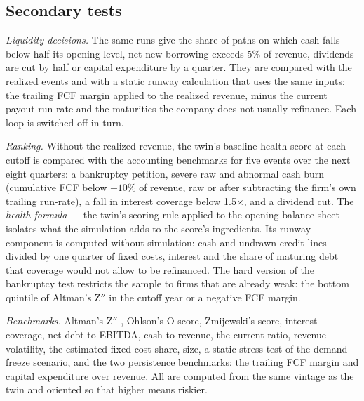 \documentclass[11pt]{article}
\begin{document}
\subsection{Secondary tests}
\emph{Liquidity decisions.} The same runs give the share of paths on which cash falls below half its opening level, net new borrowing exceeds 5\% of revenue, dividends are cut by half or capital expenditure by a quarter. They are compared with the realized events and with a static runway calculation that uses the same inputs: the trailing FCF margin applied to the realized revenue, minus the current payout run-rate and the maturities the company does not usually refinance. Each loop is switched off in turn.

\emph{Ranking.} Without the realized revenue, the twin's baseline health score at each cutoff is compared with the accounting benchmarks for five events over the next eight quarters: a bankruptcy petition, severe raw and abnormal cash burn (cumulative FCF below $-10\%$ of revenue, raw or after subtracting the firm's own trailing run-rate), a fall in interest coverage below 1.5$\times$, and a dividend cut. The \emph{health formula} --- the twin's scoring rule applied to the opening balance sheet --- isolates what the simulation adds to the score's ingredients. Its runway component is computed without simulation: cash and undrawn credit lines divided by one quarter of fixed costs, interest and the share of maturing debt that coverage would not allow to be refinanced. The hard version of the bankruptcy test restricts the sample to firms that are already weak: the bottom quintile of Altman's Z$''$ in the cutoff year or a negative FCF margin.

\emph{Benchmarks.} Altman's Z$''$ \citep{altman2006}, Ohlson's O-score, Zmijewski's score, interest coverage, net debt to EBITDA, cash to revenue, the current ratio, revenue volatility, the estimated fixed-cost share, size, a static stress test of the demand-freeze scenario, and the two persistence benchmarks: the trailing FCF margin and capital expenditure over revenue. All are computed from the same vintage as the twin and oriented so that higher means riskier.
\end{document}
